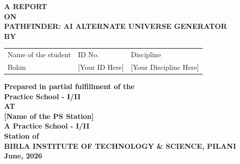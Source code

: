 \documentclass[12pt,a4paper]{report}
\begin{document}
\begin{titlepage}
    \centering
    \vspace*{1cm}
    
    {\Large \textbf{A REPORT}}\\[0.5cm]
    {\Large \textbf{ON}}\\[0.5cm]
    {\Large \textbf{PATHFINDER: AI ALTERNATE UNIVERSE GENERATOR}}\\[2cm]
    
    {\large \textbf{BY}}\\[1cm]
    
    \begin{table}[h]
        \centering
        \begin{tabular}{lll}
        Name of the student & ID No. & Discipline \\
        Bohin & [Your ID Here] & [Your Discipline Here] \\
        \end{tabular}
    \end{table}
    
    \vspace{2cm}
    
    {\large \textbf{Prepared in partial fulfillment of the}}\\
    {\large \textbf{Practice School - I/II}}\\[1cm]
    
    {\large \textbf{AT}}\\[1cm]
    
    {\large \textbf{[Name of the PS Station]}}\\
    {\large \textbf{A Practice School - I/II}}\\
    {\large \textbf{Station of}}\\[1cm]
    
    {\large \textbf{BIRLA INSTITUTE OF TECHNOLOGY \& SCIENCE, PILANI}}\\[0.5cm]
    {\large \textbf{June, 2026}}
\end{titlepage}
\end{document}
